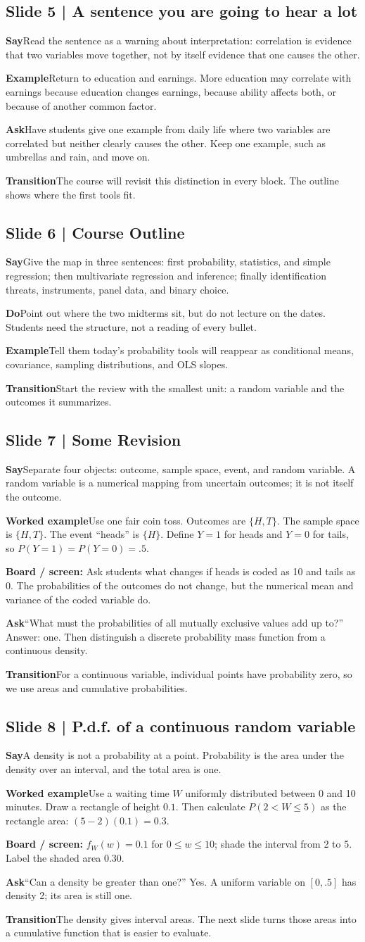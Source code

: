 \documentclass[11pt,a4paper]{article}
\newcommand{\slideheading}[1]{\subsection*{\color{accent}#1}}
\newcommand{\cue}[2]{\par\noindent\textbf{#1}\quad #2\par}
\newcommand{\board}[1]{\par\noindent\colorbox{soft}{\parbox{0.96\textwidth}{\textbf{Board / screen:} #1}}\par}
\begin{document}
\slideheading{Slide 5 | A sentence you are going to hear a lot}
\cue{Say}{Read the sentence as a warning about interpretation: correlation is evidence that two variables move together, not by itself evidence that one causes the other.}
\cue{Example}{Return to education and earnings. More education may correlate with earnings because education changes earnings, because ability affects both, or because of another common factor.}
\cue{Ask}{Have students give one example from daily life where two variables are correlated but neither clearly causes the other. Keep one example, such as umbrellas and rain, and move on.}
\cue{Transition}{The course will revisit this distinction in every block. The outline shows where the first tools fit.}

\slideheading{Slide 6 | Course Outline}
\cue{Say}{Give the map in three sentences: first probability, statistics, and simple regression; then multivariate regression and inference; finally identification threats, instruments, panel data, and binary choice.}
\cue{Do}{Point out where the two midterms sit, but do not lecture on the dates. Students need the structure, not a reading of every bullet.}
\cue{Example}{Tell them today's probability tools will reappear as conditional means, covariance, sampling distributions, and OLS slopes.}
\cue{Transition}{Start the review with the smallest unit: a random variable and the outcomes it summarizes.}

\slideheading{Slide 7 | Some Revision}
\cue{Say}{Separate four objects: outcome, sample space, event, and random variable. A random variable is a numerical mapping from uncertain outcomes; it is not itself the outcome.}
\cue{Worked example}{Use one fair coin toss. Outcomes are $\{H,T\}$. The sample space is $\{H,T\}$. The event ``heads'' is $\{H\}$. Define $Y=1$ for heads and $Y=0$ for tails, so $P(Y=1)=P(Y=0)=.5$.}
\board{Ask students what changes if heads is coded as 10 and tails as 0. The probabilities of the outcomes do not change, but the numerical mean and variance of the coded variable do.}
\cue{Ask}{``What must the probabilities of all mutually exclusive values add up to?'' Answer: one. Then distinguish a discrete probability mass function from a continuous density.}
\cue{Transition}{For a continuous variable, individual points have probability zero, so we use areas and cumulative probabilities.}

\slideheading{Slide 8 | P.d.f. of a continuous random variable}
\cue{Say}{A density is not a probability at a point. Probability is the area under the density over an interval, and the total area is one.}
\cue{Worked example}{Use a waiting time $W$ uniformly distributed between 0 and 10 minutes. Draw a rectangle of height $0.1$. Then calculate $P(2<W\leq5)$ as the rectangle area: $(5-2)(0.1)=0.3$.}
\board{$f_W(w)=0.1$ for $0\leq w\leq10$; shade the interval from 2 to 5. Label the shaded area $0.30$.}
\cue{Ask}{``Can a density be greater than one?'' Yes. A uniform variable on $[0,.5]$ has density 2; its area is still one.}
\cue{Transition}{The density gives interval areas. The next slide turns those areas into a cumulative function that is easier to evaluate.}
\end{document}
